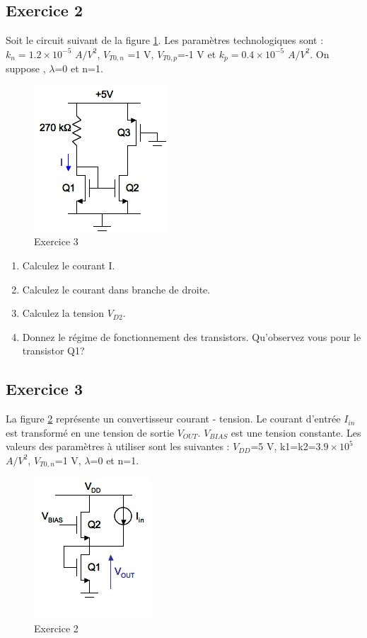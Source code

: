 \documentclass[paper=a4, fontsize=11pt]{article} %
\numberwithin{equation}{section} %
\numberwithin{figure}{section} %
\numberwithin{table}{section} %
\begin{document}
\subsection*{Exercice 2}
Soit le circuit suivant de la figure \ref{fig1-3}. Les paramètres technologiques sont : $k_{n}=1.2\times10^{-5}$ $A/V^2$, $V_{T0,n}$ =1 V, $V_{T0,p}$=-1 V et $k_{p}=0.4\times 10^{-5}$ $A/V^2$. On suppose , $\lambda$=0 et n=1.

\begin{figure}[!htbp]
   \centering
   \includegraphics[]{figure/fig1-3.png}
   \caption{Exercice 3}
   \label{fig1-3}
\end{figure}

\begin{enumerate}
\item Calculez le courant I.
\item Calculez le courant dans branche de droite.
\item Calculez la tension $V_{D2}$.
\item Donnez le régime de fonctionnement des transistors. Qu'observez vous pour le transistor Q1?
\end{enumerate}

\subsection*{Exercice 3}
La figure \ref{fig1-2} représente un convertisseur courant - tension. Le courant d'entrée $I_{in}$ est transformé en une tension de sortie $V_{OUT}$. $V_{BIAS}$ est une tension constante. Les valeurs
des paramètres à utiliser sont les suivantes : $V_{DD}$=5 V, k1=k2=$3.9\times 10^5$ $A/V^2$, $V_{T0,n}$=1 V, $\lambda$=0 et n=1.

\begin{figure}[!htbp]
   \centering
   \includegraphics[]{figure/fig1-2.png}
   \caption{Exercice 2}
   \label{fig1-2}
\end{figure}
\end{document}
